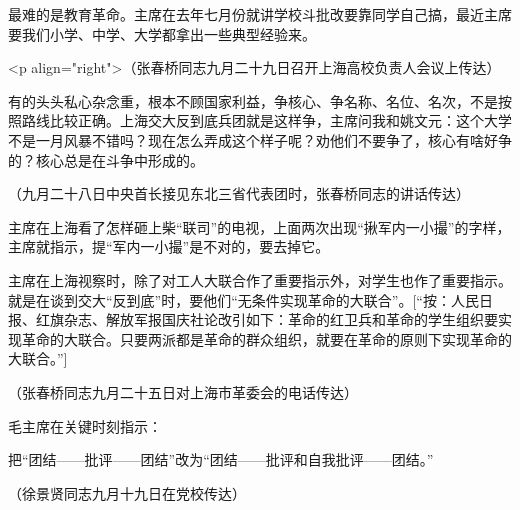最难的是教育革命。主席在去年七月份就讲学校斗批改要靠同学自己搞，最近主席要我们小学、中学、大学都拿出一些典型经验来。

<p align="right">（张春桥同志九月二十九日召开上海高校负责人会议上传达）

有的头头私心杂念重，根本不顾国家利益，争核心、争名称、名位、名次，不是按照路线比较正确。上海交大反到底兵团就是这样争，主席问我和姚文元：这个大学不是一月风暴不错吗？现在怎么弄成这个样子呢？劝他们不要争了，核心有啥好争的？核心总是在斗争中形成的。

{\raggedleft （九月二十八日中央首长接见东北三省代表团时，张春桥同志的讲话传达）\par}

主席在上海看了怎样砸上柴“联司”的电视，上面两次出现“揪军内一小撮”的字样，主席就指示，提“军内一小撮”是不对的，要去掉它。

主席在上海视察时，除了对工人大联合作了重要指示外，对学生也作了重要指示。就是在谈到交大“反到底”时，要他们“无条件实现革命的大联合”。[“按：人民日报、红旗杂志、解放军报国庆社论改引如下：革命的红卫兵和革命的学生组织要实现革命的大联合。只要两派都是革命的群众组织，就要在革命的原则下实现革命的大联合。”]

{\raggedleft （张春桥同志九月二十五日对上海市革委会的电话传达）\par}

毛主席在关键时刻指示：

把“团结——批评——团结”改为“团结——批评和自我批评——团结。”

{\raggedleft （徐景贤同志九月十九日在党校传达）\par}


